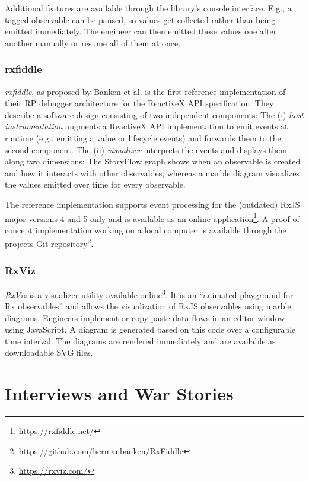 \documentclass[sigplan,screen,review]{acmart}
\begin{document}
Additional features are available through the library's console interface. E.g., a tagged observable can be paused, so values get collected rather than being emitted immediately. The engineer can then emitted these values one after another manually or resume all of them at once.

\subsubsection{rxfiddle}

\emph{rxfiddle}, as proposed by Banken et al.\cite{10.1145/3180155.3180156} is the first reference implementation of their RP debugger architecture for the ReactiveX API specification. They describe a software design consisting of two independent components: The (i) \emph{host instrumentation} augments a ReactiveX API implementation to emit events at runtime (e.g., emitting a value or lifecycle events) and forwards them to the second component. The (ii) \emph{visualizer} interprets the events and displays them along two dimensions: The StoryFlow graph\cite{YWu2013a} shows when an observable is created and how it interacts with other observables, whereas a marble diagram visualizes the values emitted over time for every observable.

The reference implementation supports event processing for the (outdated) RxJS major versions 4 and 5 only and is available as an online application\footnote{\url{https://rxfiddle.net/}}. A proof-of-concept implementation working on a local computer is available through the projects Git repository\footnote{\url{https://github.com/hermanbanken/RxFiddle}}.

\subsubsection{RxViz}

\emph{RxViz} is a visualizer utility available online\footnote{\url{https://rxviz.com/}}. It is an ``animated playground for Rx observables''\cite{rxviz} and allows the visualization of RxJS observables using marble diagrams. Engineers implement or copy-paste data-flows in an editor window using JavaScript. A diagram is generated based on this code over a configurable time interval. The diagrams are rendered immediately and are available as downloadable SVG files.


\section{Interviews and War Stories}
\label{sec:interviews}
\end{document}
